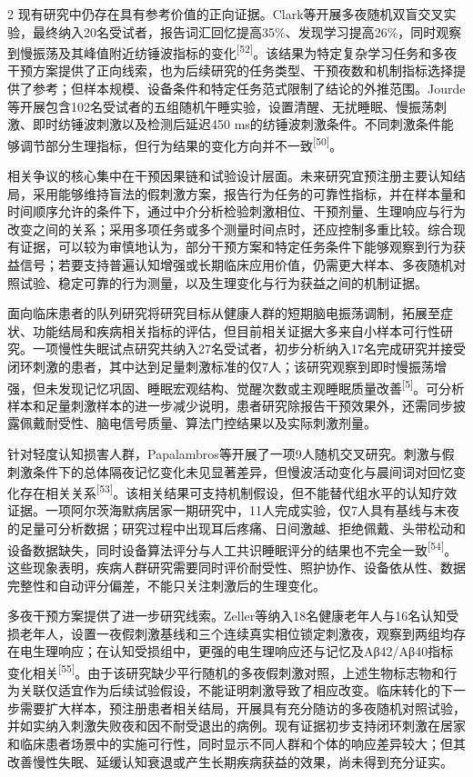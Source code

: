 \documentclass[UTF8,zihao=5,fontset=none]{ctexart}
\newcommand{\hei}{\CJKfamily{hei}}
\newcommand{\leveltwo}[1]{%
  \par\noindent{\hei\fontsize{10.5pt}{12.6pt}\selectfont\mdseries #1\par}}
\newcommand{\refcite}[1]{\nolinebreak[4]\textsuperscript{[#1]}}
\begin{document}
\begin{multicols}{2}
现有研究中仍存在具有参考价值的正向证据。Clark等开展多夜随机双盲交叉实验，最终纳入20名受试者，报告词汇回忆提高35\%、发现学习提高26\%，同时观察到慢振荡及其峰值附近纺锤波指标的变化\refcite{52}。该结果为特定复杂学习任务和多夜干预方案提供了正向线索，也为后续研究的任务类型、干预夜数和机制指标选择提供了参考；但样本规模、设备条件和特定任务范式限制了结论的外推范围。Jourde等开展包含102名受试者的五组随机午睡实验，设置清醒、无扰睡眠、慢振荡刺激、即时纺锤波刺激以及检测后延迟450 ms的纺锤波刺激条件。不同刺激条件能够调节部分生理指标，但行为结果的变化方向并不一致\refcite{50}。\par

相关争议的核心集中在干预因果链和试验设计层面。未来研究宜预注册主要认知结局，采用能够维持盲法的假刺激方案，报告行为任务的可靠性指标，并在样本量和时间顺序允许的条件下，通过中介分析检验刺激相位、干预剂量、生理响应与行为改变之间的关系；采用多项任务或多个测量时间点时，还应控制多重比较。综合现有证据，可以较为审慎地认为，部分干预方案和特定任务条件下能够观察到行为获益信号；若要支持普遍认知增强或长期临床应用价值，仍需更大样本、多夜随机对照试验、稳定可靠的行为测量，以及生理变化与行为获益之间的机制证据。\par

\leveltwo{3.4 慢性失眠、阿尔茨海默病等临床队列研究进展}

面向临床患者的队列研究将研究目标从健康人群的短期脑电振荡调制，拓展至症状、功能结局和疾病相关指标的评估，但目前相关证据大多来自小样本可行性研究。一项慢性失眠试点研究共纳入27名受试者，初步分析纳入17名完成研究并接受闭环刺激的患者，其中达到足量刺激标准的仅7人；该研究观察到即时慢振荡增强，但未发现记忆巩固、睡眠宏观结构、觉醒次数或主观睡眠质量改善\refcite{5}。可分析样本和足量刺激样本的进一步减少说明，患者研究除报告干预效果外，还需同步披露佩戴耐受性、脑电信号质量、算法门控结果以及实际刺激剂量。\par

针对轻度认知损害人群，Papalambros等开展了一项9人随机交叉研究。刺激与假刺激条件下的总体隔夜记忆变化未见显著差异，但慢波活动变化与晨间词对回忆变化存在相关关系\refcite{53}。该相关结果可支持机制假设，但不能替代组水平的认知疗效证据。一项阿尔茨海默病居家一期研究中，11人完成实验，仅7人具有基线与末夜的足量可分析数据；研究过程中出现耳后疼痛、日间激越、拒绝佩戴、头带松动和设备数据缺失，同时设备算法评分与人工共识睡眠评分的结果也不完全一致\refcite{54}。这些现象表明，疾病人群研究需要同时评价耐受性、照护协作、设备依从性、数据完整性和自动评分偏差，不能只关注刺激后的生理变化。\par

多夜干预方案提供了进一步研究线索。Zeller等纳入18名健康老年人与16名认知受损老年人，设置一夜假刺激基线和三个连续真实相位锁定刺激夜，观察到两组均存在电生理响应；在认知受损组中，更强的电生理响应还与记忆及Aβ42/Aβ40指标变化相关\refcite{55}。由于该研究缺少平行随机的多夜假刺激对照，上述生物标志物和行为关联仅适宜作为后续试验假设，不能证明刺激导致了相应改变。临床转化的下一步需要扩大样本，预注册患者相关结局，开展具有充分随访的多夜随机对照试验，并如实纳入刺激失败夜和因不耐受退出的病例。现有证据初步支持闭环刺激在居家和临床患者场景中的实施可行性，同时显示不同人群和个体的响应差异较大；但其改善慢性失眠、延缓认知衰退或产生长期疾病获益的效果，尚未得到充分证实。\par


\end{multicols}
\end{document}
